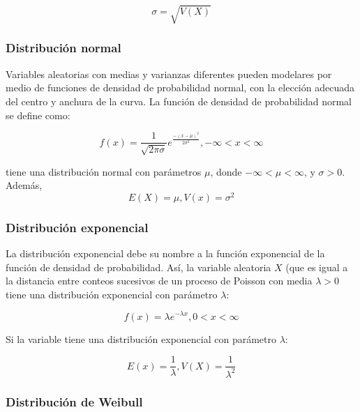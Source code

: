 \begin{equation}
\sigma=\sqrt{V(X)}
\end{equation}

\subsubsection{Distribución normal}

Variables aleatorias con medias y varianzas diferentes pueden modelares por medio de funciones de densidad de probabilidad normal, con la elección adecuada del centro y anchura de la curva. La función de densidad de probabilidad normal se define como:

\begin{equation}
f(x)=\frac{1}{\sqrt{2\pi\sigma}}e^{\frac{-(x-\mu)^2}{2\sigma^2}}  ,  -\infty<x<\infty
\end{equation}

tiene una distribución normal con parámetros $\mu$, donde $-\infty<\mu<\infty$, y $\sigma>0$.\\

Además,
\begin{equation}
E(X)=\mu , V(x)=\sigma^2
\end{equation}

\subsubsection{Distribución exponencial}

La distribución exponencial debe su nombre a la función exponencial de la función de densidad de probabilidad. Así, la variable aleatoria $X$ (que es igual a la distancia entre conteos sucesivos de un proceso de Poisson con media $\lambda>0$ tiene una distribución exponencial con parámetro $\lambda$:

\begin{equation}
f(x)=\lambda e^{-\lambda x}, 0<x<\infty
\end{equation}

Si la variable tiene una distribución exponencial con parámetro $\lambda$:

\begin{equation}
E(x)=\frac{1}{\lambda}, V(X)=\frac{1}{\lambda^2}
\end{equation}

\subsubsection{Distribución de Weibull}

